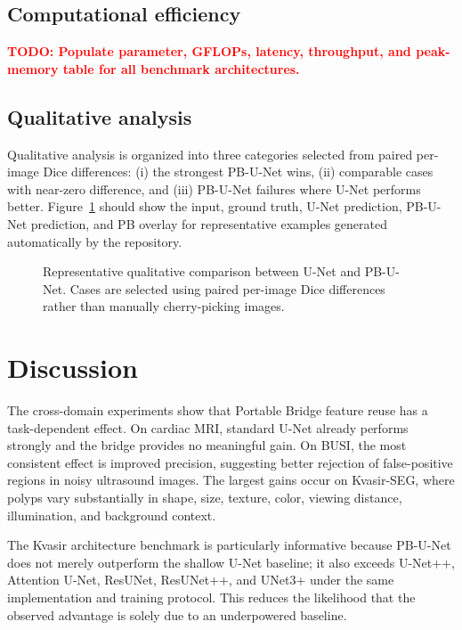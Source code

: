 \documentclass[11pt]{article}
\newcommand{\todoresult}[1]{\textcolor{red}{\textbf{TODO: #1}}}
\begin{document}
\subsection{Computational efficiency}
\todoresult{Populate parameter, GFLOPs, latency, throughput, and peak-memory table for all benchmark architectures.}

\subsection{Qualitative analysis}
Qualitative analysis is organized into three categories selected from paired per-image Dice differences: (i) the strongest PB-U-Net wins, (ii) comparable cases with near-zero difference, and (iii) PB-U-Net failures where U-Net performs better. Figure~\ref{fig:qualitative} should show the input, ground truth, U-Net prediction, PB-U-Net prediction, and PB overlay for representative examples generated automatically by the repository.

\begin{figure}[t]
\centering
{}
\caption{Representative qualitative comparison between U-Net and PB-U-Net. Cases are selected using paired per-image Dice differences rather than manually cherry-picking images.}
\label{fig:qualitative}
\end{figure}

\section{Discussion}
The cross-domain experiments show that Portable Bridge feature reuse has a task-dependent effect. On cardiac MRI, standard U-Net already performs strongly and the bridge provides no meaningful gain. On BUSI, the most consistent effect is improved precision, suggesting better rejection of false-positive regions in noisy ultrasound images. The largest gains occur on Kvasir-SEG, where polyps vary substantially in shape, size, texture, color, viewing distance, illumination, and background context.

The Kvasir architecture benchmark is particularly informative because PB-U-Net does not merely outperform the shallow U-Net baseline; it also exceeds U-Net++, Attention U-Net, ResUNet, ResUNet++, and UNet3+ under the same implementation and training protocol. This reduces the likelihood that the observed advantage is solely due to an underpowered baseline.
\end{document}
